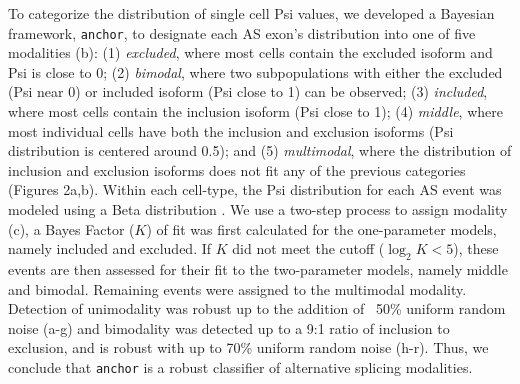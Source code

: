 To categorize the distribution of single cell Psi values, we developed a Bayesian framework, \texttt{anchor}, to designate each AS exon's distribution into one of five modalities (b): (1) \emph{excluded}, where most cells contain the excluded isoform and Psi is close to 0; (2) \emph{bimodal}, where two subpopulations with either the excluded (Psi near 0) or included isoform (Psi close to 1) can be observed; (3) \emph{included}, where most cells contain the inclusion isoform (Psi close to 1); (4) \emph{middle}, where most individual cells have both the inclusion and exclusion isoforms (Psi distribution is centered around 0.5); and (5) \emph{multimodal}, where the distribution of inclusion and exclusion isoforms does not fit any of the previous categories (Figures 2a,b). Within each cell-type, the Psi distribution for each AS event was modeled using a Beta distribution \cite{Barash2010}. We use a two-step process to assign modality (c), a Bayes Factor ($K$) of fit was first calculated for the one-parameter models, namely included and excluded. If $K$ did not meet the cutoff ($\log_2 K < 5$), these events are then assessed for their fit to the two-parameter models, namely middle and bimodal. Remaining events were assigned to the multimodal modality. Detection of unimodality was robust up to the addition of ~50\% uniform random noise (a-g) and bimodality was detected up to a 9:1 ratio of inclusion to exclusion, and is robust with up to 70\% uniform random noise (h-r). Thus, we conclude that \texttt{anchor} is a robust classifier of alternative splicing modalities.

